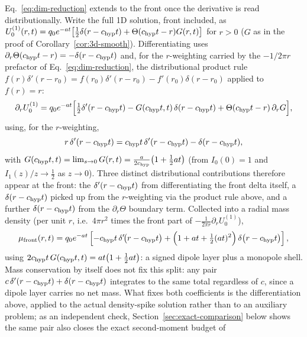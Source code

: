 \begin{remark}
\label{rem:3d-front-dipole}
Eq.~\eqref{eq:dim-reduction} extends to the front once the derivative is
read distributionally. Write the full 1D solution, front included, as
$U_0^{(1)}(r,t)=q_0e^{-at}\big[\tfrac12\delta(r-c_{\rm hyp}
t)+\Theta(c_{\rm hyp} t-r)G(r,t)\big]$ for $r>0$ ($G$ as in the proof of
Corollary~\ref{cor:3d-smooth}). Differentiating uses
$\partial_r\Theta(c_{\rm hyp} t-r)=-\delta(r-c_{\rm hyp} t)$ and, for the $r$-weighting
carried by the $-1/2\pi r$ prefactor of Eq.~\eqref{eq:dim-reduction}, the
distributional product rule
$f(r)\delta'(r-r_0)=f(r_0)\delta'(r-r_0)-f'(r_0)\delta(r-r_0)$ applied to
$f(r)=r$:
\begin{equation}
  \partial_rU_0^{(1)} = q_0e^{-at}\Big[\tfrac12\delta'(r-c_{\rm hyp} t)
    - G(c_{\rm hyp} t,t)\,\delta(r-c_{\rm hyp} t) + \Theta(c_{\rm hyp} t-r)\,\partial_rG\Big] ,
\end{equation}
using, for the $r$-weighting,
\begin{equation}
  r\,\delta'(r-c_{\rm hyp} t) = c_{\rm hyp} t\,\delta'(r-c_{\rm hyp} t) - \delta(r-c_{\rm hyp} t) ,
\end{equation}
with $G(c_{\rm hyp} t,t)=\lim_{s\to0}G(r,t)=\tfrac{a}{2c_{\rm hyp}}\big(1+\tfrac12at\big)$
(from $I_0(0)=1$ and $I_1(z)/z\to\tfrac12$ as $z\to0$). Three distinct
distributional contributions therefore appear at the front: the
$\delta'(r-c_{\rm hyp} t)$ from differentiating the front delta itself, a
$\delta(r-c_{\rm hyp} t)$ picked up from the $r$-weighting via the product rule
above, and a further $\delta(r-c_{\rm hyp} t)$ from the $\partial_r\Theta$
boundary term. Collected into a radial mass density (per unit $r$, i.e.\
$4\pi r^2$ times the front part of $-\tfrac1{2\pi r}\partial_rU_0^{(1)}$),
\begin{equation}
  \label{eq:front-measure-3d}
  \mu_{\rm front}(r,t) = q_0e^{-at}\left[
    -c_{\rm hyp} t\,\delta'\!\big(r-c_{\rm hyp} t\big)
    +\Big(1+at+\tfrac12(at)^2\Big)\,\delta\big(r-c_{\rm hyp} t\big)\right] ,
\end{equation}
using $2c_{\rm hyp} t\,G(c_{\rm hyp} t,t)=at\big(1+\tfrac12at\big)$: a signed dipole
layer plus a monopole shell. Mass conservation by itself does not fix this
split: any pair $c\,\delta'(r-c_{\rm hyp} t)+\delta(r-c_{\rm hyp} t)$ integrates to the
same total regardless of $c$, since a dipole layer carries no net mass.
What fixes both coefficients is the differentiation above, applied to the
actual density-spike solution rather than to an auxiliary problem; as an
independent check, Section~\ref{sec:exact-comparison} below shows the same
pair also closes the exact second-moment budget of

\end{remark}
